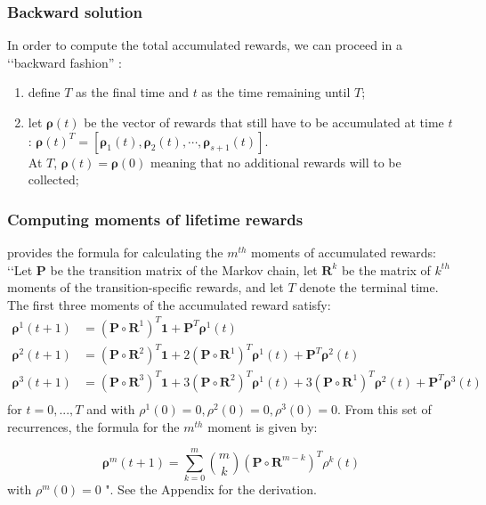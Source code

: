 \documentclass[\main/main.tex]{subfiles}
\begin{document}
\subsubsection{Backward solution}
In order to compute the total accumulated rewards, we can proceed in a \lq\lq backward fashion'' \citep{Caswell2011, Howard1960}: 
\begin{enumerate}
    \item define $T$ as the final time and $t$ as the time remaining until $T$;
    \item let  $\bm{\rho}(t) $ be the vector of rewards that still have to be accumulated at time $t$: $\bm{\rho}(t)^T = [\bm{\rho}_1(t), \bm{\rho}_2(t), \cdots, \bm{\rho}_{s+1}(t)] $.\\ At $T$, $\bm{\rho}(t) = \bm{\rho}(0) $  meaning that no additional rewards will to be collected;
\end{enumerate}   

\subsubsection{Computing moments of lifetime rewards}

\cite{Caswell2011} provides the formula for calculating the $m^{th}$ moments of accumulated rewards: \lq\lq Let $\mathbf{P}$ be the transition matrix of the Markov
chain, let $\mathbf{R}^k$ be the matrix of $k^{th}$ moments of the transition-specific rewards, and let $T$ denote the terminal time. The first three moments of the accumulated reward satisfy: 
\begin{equation}
    \begin{split}
     \bm{\rho}^1(t+1) &= (\mathbf{P} \circ \mathbf{R}^1) ^T\mathbf{1} + \mathbf{P}^T \bm{\rho}^1(t) \\
      \bm{\rho}^2(t+1) &= (\mathbf{P} \circ \mathbf{R}^2) ^ T\mathbf{1} + 2 (\mathbf{P} \circ \mathbf{R}^1) ^T \bm{\rho}^1(t) + 
      \mathbf{P}^T \bm{\rho}^2(t) \\
     \bm{\rho}^3(t+1) &= (\mathbf{P} \circ \mathbf{R}^3) ^ T\mathbf{1} + 3 (\mathbf{P} \circ \mathbf{R}^2) ^T \bm{\rho}^1(t) + 3 (\mathbf{P} \circ \mathbf{R}^1) ^T \bm{\rho}^2(t) + \mathbf{P}^T \bm{\rho}^3(t) \\
\end{split}
\end{equation}for $t=0, ... ,T$ and with $\rho^1(0) = 0, \rho^2(0) = 0,\rho^3(0) = 0$.
From this set of recurrences, the formula for the $m^{th}$ moment is given by:

\begin{equation}\label{moments}
    \bm{\rho}^m(t+1) = \sum_{k=0}^{m} {m \choose k} (\mathbf{P} \circ \mathbf{R}^{m-k}) ^ T \rho^k(t)
\end{equation}
with $\rho^m(0)=0$ ". See the Appendix for the derivation. 
\end{document}
